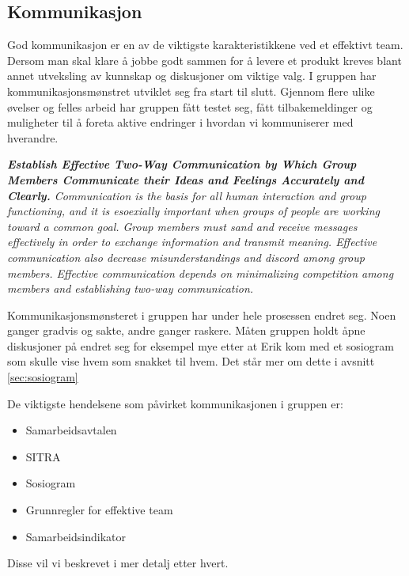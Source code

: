 \subsection{Kommunikasjon}


God kommunikasjon er en av de viktigste karakteristikkene ved et effektivt team.
Dersom man skal klare å jobbe godt sammen for å levere et produkt kreves blant annet utveksling av kunnskap og diskusjoner om viktige valg.
I gruppen har kommunikasjonsmønstret utviklet seg fra start til slutt.
Gjennom flere ulike øvelser og felles arbeid har gruppen fått testet seg, fått tilbakemeldinger og muligheter til å foreta aktive endringer i hvordan vi kommuniserer med hverandre.

\textit{
\textbf{
Establish Effective Two-Way Communication by Which Group Members Communicate their Ideas and Feelings Accurately and Clearly.
}
Communication is the basis for all human interaction and group functioning, and it is esoexially important when groups of people are working toward a common goal.
Group members must sand and receive messages effectively in order to exchange information and transmit meaning.
Effective communication also decrease misunderstandings and discord among group members.
Effective communication depends on minimalizing competition among members and establishing two-way communication.
}
\cite{group_dynamics}

Kommunikasjonsmønsteret i gruppen har under hele prosessen endret seg.
Noen ganger gradvis og sakte, andre ganger raskere.
Måten gruppen holdt åpne diskusjoner på endret seg for eksempel mye etter at Erik kom med et sosiogram som skulle vise hvem som snakket til hvem.
Det står mer om dette i avsnitt \ref{sec:sosiogram}

De viktigste hendelsene som påvirket kommunikasjonen i gruppen er:

\begin{itemize}
\item Samarbeidsavtalen
\item SITRA
\item Sosiogram
\item Grunnregler for effektive team
\item Samarbeidsindikator
\end{itemize}
Disse vil vi beskrevet i mer detalj etter hvert.

